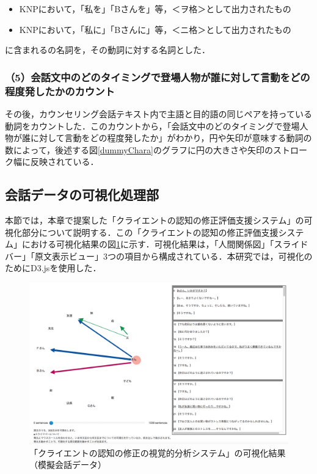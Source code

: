 \documentclass[shuuron]{kuee}
\begin{document}
\begin{itemize}

  \item KNPにおいて，「私を」「Bさんを」等，＜ヲ格＞として出力されたもの
  \item KNPにおいて，「私に」「Bさんに」等，＜ニ格＞として出力されたもの
\end{itemize}
に含まれるの名詞を，その動詞に対する名詞とした．

\subsubsection{（5）会話文中のどのタイミングで登場人物が誰に対して言動をどの程度発したかのカウント}

その後，カウンセリング会話テキスト内で主語と目的語の同じペアを持っている動詞をカウントした．このカウントから，「会話文中のどのタイミングで登場人物が誰に対して言動をどの程度発したか」がわかり，円や矢印が意味する動詞の数によって，後述する図\ref{dummyChara}のグラフに円の大きさや矢印のストローク幅に反映されている．


\subsection{会話データの可視化処理部}

本節では，本章で提案した「クライエントの認知の修正評価支援システム」の可視化部分について説明する．この「クライエントの認知の修正評価支援システム」における可視化結果の図\ref{fig:dummyChara}に示す．可視化結果は，「人間関係図」「スライドバー」「原文表示ビュー」3つの項目から構成されている．本研究では，可視化のためにD3.js\cite{vand3}を使用した．%

\begin{figure}
  \begin{center}
    \includegraphics[width=\linewidth]{dummyChara.png}
  \end{center}
  \caption{「クライエントの認知の修正の視覚的分析システム」の可視化結果（模擬会話データ）}
  \label{fig:dummyChara}
\end{figure}
\end{document}
